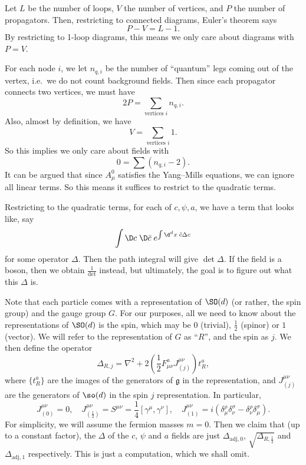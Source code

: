 \documentclass[a4paper]{article}
\begin{document}
Let $L$ be the number of loops, $V$ the number of vertices, and $P$ the number of propagators. Then, restricting to connected diagrams, Euler's theorem says
\[
  P - V = L - 1.
\]
By restricting to 1-loop diagrams, this means we only care about diagrams with $P = V$.

For each node $i$, we let $n_{q, i}$ be the number of ``quantum'' legs coming out of the vertex, i.e.\ we do not count background fields. Then since each propagator connects two vertices, we must have
\[
  2P = \sum_{\text{vertices $i$}} n_{q, i}.
\]
Also, almost by definition, we have
\[
  V = \sum_{\text{vertices $i$}} 1.
\]
So this implies we only care about fields with
\[
  0 = \sum (n_{q, i} - 2).
\]
It can be argued that since $A^0_\mu$ satisfies the Yang--Mills equations, we can ignore all linear terms. So this means it suffices to restrict to the quadratic terms. %

Restricting to the quadratic terms, for each of $c, \psi, a$, we have a term that looks like, say
\[
  \int \D c \;\D \bar{c}\; e^{\int \d^d x\; \bar{c} \Delta c}
\]
for some operator $\Delta$. Then the path integral will give $\det \Delta$. If the field is a boson, then we obtain $\frac{1}{\det}$ instead, but ultimately, the goal is to figure out what this $\Delta$ is.

Note that each particle comes with a representation of $\SO(d)$ (or rather, the spin group) and the gauge group $G$. For our purposes, all we need to know about the representations of $\SO(d)$ is the spin, which may be $0$ (trivial), $\frac{1}{2}$ (spinor) or $1$ (vector). We will refer to the representation of $G$ as ``$R$'', and the spin as $j$. We then define the operator
\[
  \Delta_{R, j} = \nabla^2 + 2 \left(\frac{1}{2} F_{\mu\nu}^a J^{\mu\nu}_{(j)}\right) t_R^a,
\]
where $\{t_R^a\}$ are the images of the generators of $\mathfrak{g}$ in the representation, and $J^{\mu\nu}_{(j)}$ are the generators of $\so(d)$ in the spin $j$ representation. In particular,
\[
  J_{(0)}^{\mu\nu} = 0,\quad J_{(\frac{1}{2})}^{\mu\nu} = S^{\mu\nu} = \frac{1}{4} [\gamma^\mu, \gamma^\nu],\quad J_{(1)}^{\mu\nu} = i(\delta^\rho_\mu \delta^\sigma_\nu - \delta_\nu^\rho \delta_\mu^\sigma).
\]
For simplicity, we will assume the fermion masses $m = 0$. Then we claim that (up to a constant factor), the $\Delta$ of the $c$, $\psi$ and $a$ fields are just $\Delta_{\mathrm{adj}, 0}$, $\sqrt{\Delta_{R, \frac{1}{2}}}$ and $\Delta_{\mathrm{adj}, 1}$ respectively. This is just a computation, which we shall omit. %
\end{document}
